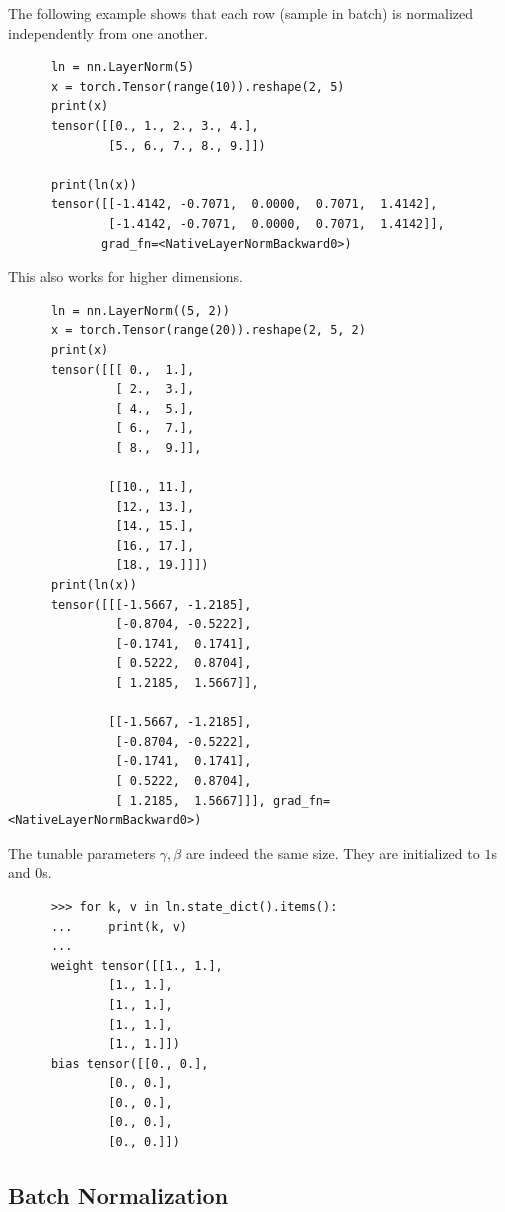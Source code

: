   \begin{example}
    \label{ex:layer-norm}
    The following example shows that each row (sample in batch) is normalized independently from one another. 
    \begin{lstlisting}
      ln = nn.LayerNorm(5)
      x = torch.Tensor(range(10)).reshape(2, 5)
      print(x)
      tensor([[0., 1., 2., 3., 4.],
              [5., 6., 7., 8., 9.]])

      print(ln(x))
      tensor([[-1.4142, -0.7071,  0.0000,  0.7071,  1.4142],
              [-1.4142, -0.7071,  0.0000,  0.7071,  1.4142]],
             grad_fn=<NativeLayerNormBackward0>)
    \end{lstlisting}
    This also works for higher dimensions. 
    \begin{lstlisting}
      ln = nn.LayerNorm((5, 2))
      x = torch.Tensor(range(20)).reshape(2, 5, 2)
      print(x)
      tensor([[[ 0.,  1.],
               [ 2.,  3.],
               [ 4.,  5.],
               [ 6.,  7.],
               [ 8.,  9.]],

              [[10., 11.],
               [12., 13.],
               [14., 15.],
               [16., 17.],
               [18., 19.]]])
      print(ln(x))
      tensor([[[-1.5667, -1.2185],
               [-0.8704, -0.5222],
               [-0.1741,  0.1741],
               [ 0.5222,  0.8704],
               [ 1.2185,  1.5667]],

              [[-1.5667, -1.2185],
               [-0.8704, -0.5222],
               [-0.1741,  0.1741],
               [ 0.5222,  0.8704],
               [ 1.2185,  1.5667]]], grad_fn=<NativeLayerNormBackward0>)
    \end{lstlisting}
    The tunable parameters $\gamma, \beta$ are indeed the same size. They are initialized to $1$s and $0$s. 
      \begin{lstlisting}
      >>> for k, v in ln.state_dict().items(): 
      ...     print(k, v)
      ... 
      weight tensor([[1., 1.],
              [1., 1.],
              [1., 1.],
              [1., 1.],
              [1., 1.]])
      bias tensor([[0., 0.],
              [0., 0.],
              [0., 0.],
              [0., 0.],
              [0., 0.]])
    \end{lstlisting}
  \end{example}

\subsection{Batch Normalization} 

